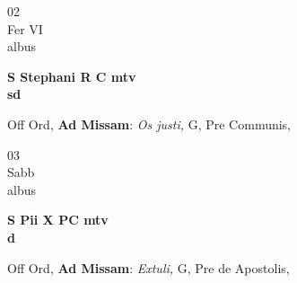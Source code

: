\documentclass[10pt, openany]{book}
\begin{document}
        \begin{center}
            \begin{minipage}{3.5in}
                \vspace{2em}
                \begin{minipage}{0.5in}
                    {\Huge 02} \\
                    {\normalsize Fer VI} \\
                    {\normalsize albus}
                \end{minipage}
                \begin{minipage}{3.0in}
                    \textbf{ \large S Stephani R C mtv \\
                    \textnormal{\normalsize sd}} \\ 
                \end{minipage}
                \begin{justify}Off Ord, \textbf{Ad Missam}: \textit{Os justi,} G, Pre Communis,   
                \end{justify}
            \end{minipage}
        \end{center}
    
        \begin{center}
            \begin{minipage}{3.5in}
                \vspace{2em}
                \begin{minipage}{0.5in}
                    {\Huge 03} \\
                    {\normalsize Sabb} \\
                    {\normalsize albus}
                \end{minipage}
                \begin{minipage}{3.0in}
                    \textbf{ \large S Pii X PC mtv \\
                    \textnormal{\normalsize d}} \\ 
                \end{minipage}
                \begin{justify}Off Ord, \textbf{Ad Missam}: \textit{Extuli,} G, Pre de Apostolis,   
                \end{justify}
            \end{minipage}
        \end{center}
    
\end{document}
